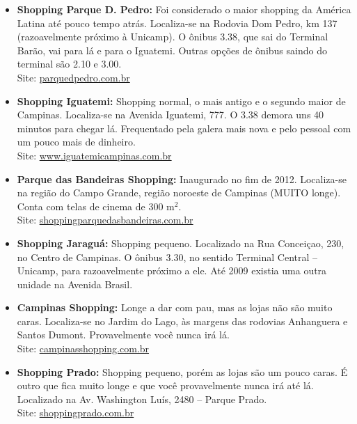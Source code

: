 \begin{itemize}
    \item   \textbf{Shopping Parque D. Pedro:} Foi considerado o maior shopping
        da América Latina até pouco tempo atrás. Localiza-se na Rodovia Dom
        Pedro, km 137 (razoavelmente próximo à Unicamp). O ônibus 3.38, que sai
        do Terminal Barão, vai para lá e para o Iguatemi. Outras opções de
        ônibus saindo do terminal são 2.10 e 3.00.
        \\Site: \url{parquedpedro.com.br}

    \item   \textbf{Shopping Iguatemi:} Shopping normal, o mais antigo e o
        segundo maior de Campinas. Localiza-se na Avenida Iguatemi, 777. O 3.38
        demora uns 40 minutos para chegar lá. Frequentado pela galera mais nova
        e pelo pessoal com um pouco mais de dinheiro.
        \\Site: \url{www.iguatemicampinas.com.br}

    \item   \textbf{Parque das Bandeiras Shopping:} Inaugurado no fim de 2012.
        Localiza-se na região do Campo Grande, região noroeste de Campinas 
        (MUITO longe). Conta com telas de cinema de 300 m$^{2}$.
        \\Site: \url{shoppingparquedasbandeiras.com.br}

    \item   \textbf{Shopping Jaraguá:} Shopping pequeno. Localizado na Rua Conceiçao, 
         230, no Centro de Campinas. O ônibus 3.30, no sentido Terminal Central -- Unicamp,
         para razoavelmente próximo a ele. Até 2009 existia uma outra unidade na 
         Avenida Brasil.

    \item   \textbf{Campinas Shopping:} Longe a dar com pau, mas as lojas não
        são muito caras. Localiza-se no Jardim do Lago, às margens das rodovias 
        Anhanguera e Santos Dumont. Provavelmente você nunca irá lá.
        \\Site: \url{campinasshopping.com.br}

    \item   \textbf{Shopping Prado:} Shopping pequeno, porém as lojas são um 
        pouco caras. É outro que fica muito longe e que você provavelmente nunca 
        irá até lá. Localizado na Av. Washington Luís, 2480 -- Parque Prado.
        \\Site: \url{shoppingprado.com.br}


\end{itemize}

